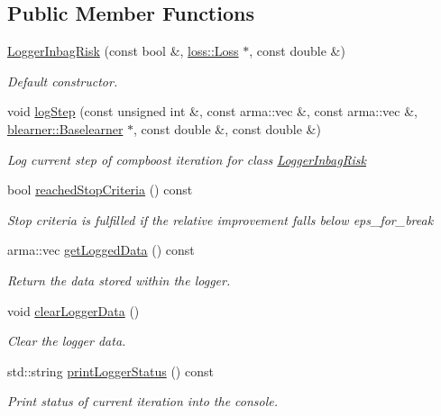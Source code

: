 \subsection*{Public Member Functions}
\begin{DoxyCompactItemize}
\item 
\hyperlink{classlogger_1_1_logger_inbag_risk_ad6aa28d3140dc547f051a3ccd0cde43d}{Logger\+Inbag\+Risk} (const bool \&, \hyperlink{classloss_1_1_loss}{loss\+::\+Loss} $\ast$, const double \&)
\begin{DoxyCompactList}\small\item\em Default constructor. \end{DoxyCompactList}\item 
void \hyperlink{classlogger_1_1_logger_inbag_risk_aa7cb90600de663c51feaaf8a0715a0f9}{log\+Step} (const unsigned int \&, const arma\+::vec \&, const arma\+::vec \&, \hyperlink{classblearner_1_1_baselearner}{blearner\+::\+Baselearner} $\ast$, const double \&, const double \&)
\begin{DoxyCompactList}\small\item\em Log current step of compboost iteration for class {\ttfamily \hyperlink{classlogger_1_1_logger_inbag_risk}{Logger\+Inbag\+Risk}} \end{DoxyCompactList}\item 
bool \hyperlink{classlogger_1_1_logger_inbag_risk_a48453cfb5a3bbe3b1a73bbcb2d40f49e}{reached\+Stop\+Criteria} () const
\begin{DoxyCompactList}\small\item\em Stop criteria is fulfilled if the relative improvement falls below {\ttfamily eps\+\_\+for\+\_\+break} \end{DoxyCompactList}\item 
arma\+::vec \hyperlink{classlogger_1_1_logger_inbag_risk_abde2b1db608804ca90ce92cd0e5dde12}{get\+Logged\+Data} () const
\begin{DoxyCompactList}\small\item\em Return the data stored within the logger. \end{DoxyCompactList}\item 
void \hyperlink{classlogger_1_1_logger_inbag_risk_ad5428486e370ae88e3bcb3a6c18d0f44}{clear\+Logger\+Data} ()
\begin{DoxyCompactList}\small\item\em Clear the logger data. \end{DoxyCompactList}\item 
std\+::string \hyperlink{classlogger_1_1_logger_inbag_risk_a3b7e827e941f2cb4b9def7296a5db38f}{print\+Logger\+Status} () const
\begin{DoxyCompactList}\small\item\em Print status of current iteration into the console. \end{DoxyCompactList}\end{DoxyCompactItemize}
